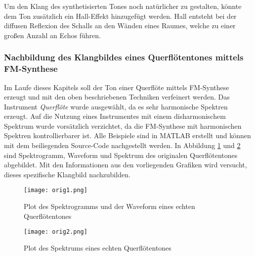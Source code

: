 Um den Klang des synthetisierten Tones noch natürlicher zu gestalten, könnte dem Ton zusätzlich ein Hall-Effekt hinzugefügt werden. Hall entsteht bei der diffusen Reflexion des Schalls an den Wänden eines Raumes, welche zu einer großen Anzahl an Echos führen. \cite[S. 108]{stotz}


\FloatBarrier
\subsubsection{Nachbildung des Klangbildes eines Querflötentones mittels FM-Synthese}

Im Laufe dieses Kapitels soll der Ton einer Querflöte mittels FM-Synthese erzeugt und mit den oben beschriebenen Techniken verfeinert werden. Das Instrument \textit{Querflöte} wurde ausgewählt, da es sehr harmonische Spektren erzeugt. Auf die Nutzung eines Instrumentes mit einem disharmonischem Spektrum wurde vorsätzlich verzichtet, da die FM-Synthese mit harmonischen Spektren kontrollierbarer ist. Alle Beispiele sind in MATLAB erstellt und können mit dem beiliegenden Source-Code nachgestellt werden. In Abbildung \ref{fig:plotFluteOrig} und \ref{fig:plotFluteOrig1} sind Spektrogramm, Waveform und Spektrum des originalen Querflötentones abgebildet. Mit den Informationen aus den vorliegenden Grafiken wird versucht, dieses spezifische Klangbild nachzubilden.

\FloatBarrier
\begin{figure} [h!t!b!]
\centering
  \texttt{[image: orig1.png]}
\caption{Plot des Spektrogramms und der Waveform eines echten Querflötentones}
\label{fig:plotFluteOrig}
\end{figure}

\begin{figure} [h!t!b!]
\centering
  \texttt{[image: orig2.png]}
\caption{Plot des Spektrums eines echten Querflötentones}
\label{fig:plotFluteOrig1}
\end{figure}
\FloatBarrier

